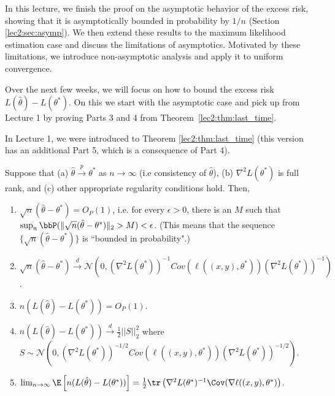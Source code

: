 \setcounter{section}{0}



In this lecture, we finish the proof on the asymptotic behavior of the excess risk, showing that it is asymptotically bounded in probability by $1/n$ (Section \ref{lec2:sec:asymp}). We then extend these results to the maximum likelihood estimation case and discuss the limitations of asymptotics. Motivated by these limitations, we introduce non-asymptotic analysis and apply it to uniform convergence.

Over the next few weeks, we will focus on how to bound the excess risk $L(\hat \theta) - L(\theta^*)$. On this we start with the asymptotic case and pick up from Lecture 1 by proving Parts 3 and 4 from Theorem~\ref{lec2:thm:last_time}.

\label{lec2:sec:asymp}
In Lecture 1, we were introduced to Theorem \ref{lec2:thm:last_time} (this version has an additional Part 5, which is a consequence of Part 4).

\begin{theorem}
\label{lec2:thm:last_time}
Suppose that (a) $\hat{\theta}  \overset{p}{\to} \theta^{*}$ as $n \to \infty$ (i.e consistency of $\hat{\theta}$), (b) $\nabla^{2}L(\theta^{*})$ is full rank, and  (c) other appropriate regularity conditions hold. Then,
\begin{enumerate}
    \item $\sqrt{n} (\hat{\theta} - \theta^{*}) = O_P(1)$, i.e. for every $\epsilon > 0$, there is an $M$ such that $\sup_n \bbP (\| \sqrt{n} (\hat{\theta} - \theta^{*}) \|_2 > M) < \epsilon$. (This means that the sequence $\{ \sqrt{n} (\hat{\theta} - \theta^{*}) \}$ is ``bounded in probability".)
    
    \item  $\sqrt{n}(\hat{\theta}-\theta^{*}) \overset{d}{\to} \mathcal{N} \left(0, (\nabla^{2}L(\theta^{*}))^{-1}Cov(\ell((x,y), \theta^*)) (\nabla^{2}L(\theta^{*}))^{-1} \right)$.
     \item $n (L(\hat{\theta}) - L(\theta^{*})) = O_P(1)$.
    \item $n (L(\hat{\theta}) - L(\theta^{*})) \overset{d}{\to} \frac{1}{2} ||S||_{2}^{2}$ where $S \sim \mathcal{N} \left(0, (\nabla^{2}L(\theta^{*}))^{-1/2}Cov(\ell((x,y), \theta^*)) (\nabla^{2}L(\theta^{*}))^{-1/2} \right)$.
    \item $\lim_{n \to \infty} \E \left[ n (L(\hat \theta) - L(\theta^*)) \right] = \frac12 \tr\left( \nabla^2 L(\theta^*)^{-1} \Cov(\nabla \ell ((x, y), \theta^*) \right)$.
\end{enumerate}
\end{theorem}

